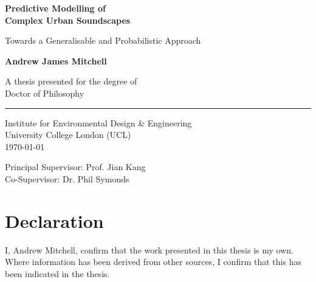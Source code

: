 \documentclass[twoside,fontsize=12pt,titlepage,chapterprefix=true
]{scrbook}
\begin{document}
\frontmatter
{}
\begin{titlepage}
      \AddToShipoutPicture*{}
      \begin{center}
            \vspace*{3cm}

            \Huge
            \textbf{Predictive Modelling of\\Complex Urban Soundscapes}

            \vspace{0.5cm}
            \LARGE
            Towards a Generalisable and Probabilistic Approach

            \vspace{1.5cm}

            \textbf{Andrew James Mitchell}

            \vfill
            A thesis presented for the degree of\\
            Doctor of Philosophy\\
            \rule[-.5cm]{0.5\textwidth}{1pt}

            \vspace{1.5cm}

            \Large
            Institute for Environmental Design \& Engineering\\
            University College London (UCL)\\
            \today

            \vspace{1cm}

            Principal Supervisor: Prof. Jian Kang\\
            Co-Supervisor: Dr. Phil Symonds

      \end{center}
\end{titlepage}


\restoregeometry


\chapter*{Declaration}
I, Andrew Mitchell, confirm that the work presented in this thesis is my own. Where information has been derived from other sources, I confirm that this has been indicated in the thesis.
\end{document}
